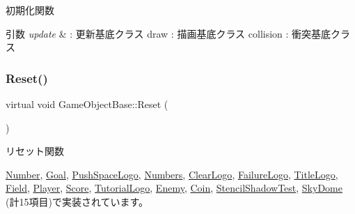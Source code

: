 初期化関数 


\begin{DoxyParams}{引数}
{\em update} & \+: 更新基底クラス draw \+: 描画基底クラス collision \+: 衝突基底クラス \\
\hline
\end{DoxyParams}
\mbox{\label{class_game_object_base_a85c59554f734bcb09f1a1e18d9517dce}} 
\subsubsection{\texorpdfstring{Reset()}{Reset()}}
{\footnotesize\ttfamily virtual void Game\+Object\+Base\+::\+Reset (\begin{DoxyParamCaption}{ }\end{DoxyParamCaption})\hspace{0.3cm}{\ttfamily [pure virtual]}}



リセット関数 



\mbox{\hyperlink{class_number_a7c6facdb1b3d0acc8309e0a915863d44}{Number}}, \mbox{\hyperlink{class_goal_a98b797c8012ab43d6fc8c42e4e91466b}{Goal}}, \mbox{\hyperlink{class_push_space_logo_afa163b1aff8df494b4f09f378bf983f0}{Push\+Space\+Logo}}, \mbox{\hyperlink{class_numbers_a1ab67e439ba1695c8fd545dfc1650990}{Numbers}}, \mbox{\hyperlink{class_clear_logo_aa19369cbace0cc79957ef7b4d4dbd0f5}{Clear\+Logo}}, \mbox{\hyperlink{class_failure_logo_a542b1617087a6701f7edb345e2a72e01}{Failure\+Logo}}, \mbox{\hyperlink{class_title_logo_a8bca39d06592b95b26024c2d86ac349c}{Title\+Logo}}, \mbox{\hyperlink{class_field_a5b140074dcca821ac702da348238c6d4}{Field}}, \mbox{\hyperlink{class_player_a457153d0edd58932e37e1356f5fe5fed}{Player}}, \mbox{\hyperlink{class_score_ad01d461a2b6ca345858b2ae0a3d81cc1}{Score}}, \mbox{\hyperlink{class_tutorial_logo_a2c9e22c81cfeafbd34f50cc766a66cf1}{Tutorial\+Logo}}, \mbox{\hyperlink{class_enemy_ab86571061e7fcabcf8c646b1abad5581}{Enemy}}, \mbox{\hyperlink{class_coin_a52c50229ce7c1e0f459e198adac70c8d}{Coin}}, \mbox{\hyperlink{class_stencil_shadow_test_a7691120143c64b99d6c8f5391be56e83}{Stencil\+Shadow\+Test}}, \mbox{\hyperlink{class_sky_dome_abc6f8ed1471d7b03f25924a849cae590}{Sky\+Dome}} (計15項目)で実装されています。

\mbox{\label{class_game_object_base_aad0e581dfba83d11af6412a0df6ecd90}} 
